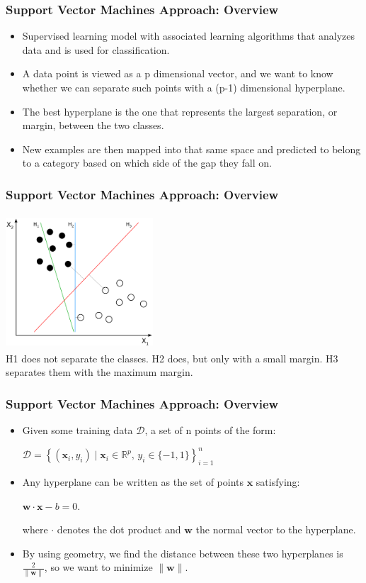 \documentclass[12pt,xcolor=dvipsnames,table,titlepage]{beamer}
\begin{document}

\begin{frame}[t]
\frametitle{Support Vector Machines Approach: Overview \cite{svm}}
\begin{itemize}
 \item Supervised learning model with associated learning algorithms that analyzes data and is used for classification.
 \item A data point is viewed as a p dimensional vector, and we want to know whether we can separate such points with a (p-1) dimensional hyperplane. 
 \item The best hyperplane is the one that represents the largest separation, or margin, between the two classes.
 \item New examples are then mapped into that same space and predicted to belong to a category based on which side of the gap they fall on.
 \end{itemize}
\end{frame}

\begin{frame}[t]
\frametitle{Support Vector Machines Approach: Overview \cite{svm}}
\begin{center}
\includegraphics[width=5.5cm, height=5cm]{images/svm1}
\\H1 does not separate the classes. H2 does, but only with a small margin. H3 separates them with the maximum margin.
\end{center}
\end{frame}

\begin{frame}[t]
\frametitle{Support Vector Machines Approach: Overview \cite{svm}}
\begin{itemize}
 \item Given some training data $\mathcal{D}$, a set of n points of the form: 
 \begin{center}
 $\mathcal{D} = \left\{ (\mathbf{x}_i, y_i)\mid\mathbf{x}_i \in \mathbb{R}^p,\, y_i \in \{-1,1\}\right\}_{i=1}^n$
  \end{center}
 \item Any hyperplane can be written as the set of points $\mathbf{x}$ satisfying: 
  \begin{center}$\mathbf{w}\cdot\mathbf{x} - b=0.$ \end{center}
  where $\cdot$ denotes the dot product and ${\mathbf{w}}$ the normal vector to the hyperplane. 
 \item By using geometry, we find the distance between these two hyperplanes is $\tfrac{2}{\|\mathbf{w}\|}$, so we want to minimize $\|\mathbf{w}\|$. 
 \end{itemize}
\end{frame}
\end{document}
